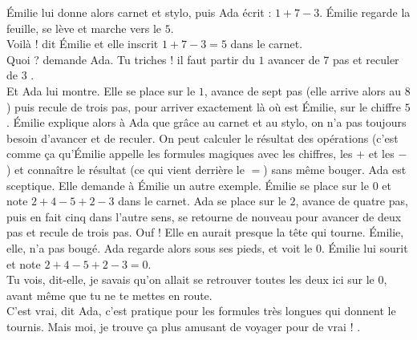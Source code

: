 Émilie lui donne alors carnet et stylo, puis Ada écrit : $1 + 7 - 3 $. Émilie regarde la feuille, se lève et marche vers le $5$.\\
\guillemotleft Voilà ! dit Émilie et elle inscrit $1 + 7 - 3 = 5$ dans le carnet.\\
\mdash Quoi ? demande Ada. Tu triches ! il faut partir du $1$ avancer de $7$ pas et reculer de $3$ \guillemotright.\\
Et Ada lui montre. Elle se place sur le $1$, avance de sept pas (elle arrive alors au $8$) puis recule de trois pas, pour arriver exactement là où est Émilie, sur le chiffre $5$. Émilie explique alors à Ada que grâce au carnet et au stylo, on n’a pas toujours besoin d’avancer et de reculer. On peut calculer le résultat des opérations (c’est comme ça qu’Émilie appelle les formules magiques avec les chiffres, les $+$ et les $-$) et connaître le résultat (ce qui vient derrière le $=$) sans même bouger. Ada est sceptique. Elle demande à Émilie un autre exemple. Émilie se place sur le $0$ et note $2 + 4 - 5 + 2 - 3$ dans le carnet. Ada se place sur le $2$, avance de quatre pas, puis en fait cinq dans l’autre sens, se retourne de nouveau pour avancer de deux pas et recule de trois pas. Ouf ! Elle en aurait presque la tête qui tourne. Émilie, elle, n’a pas bougé. Ada regarde alors sous ses pieds, et voit le $0$. Émilie lui sourit et note $2 + 4 - 5 + 2 - 3 = 0$.\\
\guillemotleft Tu vois, dit-elle, je savais qu’on allait se retrouver toutes les deux ici sur le 0, avant même que tu ne te mettes en route.\\
\mdash C’est vrai, dit Ada, c’est pratique pour les formules très longues qui donnent le tournis. Mais moi, je trouve ça plus amusant de voyager pour de vrai ! \guillemotright.

%    
